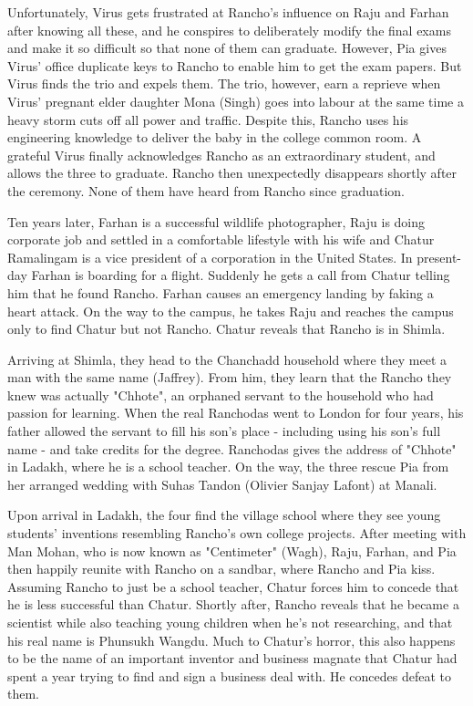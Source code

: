 \documentclass{Article}
\begin{document}
Unfortunately, Virus gets frustrated at Rancho's influence on Raju and Farhan after knowing all these, and he conspires to deliberately modify the final exams and make it so difficult so that none of them can graduate. However, Pia gives Virus' office duplicate keys to Rancho to enable him to get the exam papers. But Virus finds the trio and expels them. The trio, however, earn a reprieve when Virus' pregnant elder daughter Mona (Singh) goes into labour at the same time a heavy storm cuts off all power and traffic. Despite this, Rancho uses his engineering knowledge to deliver the baby in the college common room. A grateful Virus finally acknowledges Rancho as an extraordinary student, and allows the three to graduate. Rancho then unexpectedly disappears shortly after the ceremony. None of them have heard from Rancho since graduation.

Ten years later, Farhan is a successful wildlife photographer, Raju is doing corporate job and settled in a comfortable lifestyle with his wife and Chatur Ramalingam is a vice president of a corporation in the United States. In present-day Farhan is boarding for a flight. Suddenly he gets a call from Chatur telling him that he found Rancho. Farhan causes an emergency landing by faking a heart attack. On the way to the campus, he takes Raju and reaches the campus only to find Chatur but not Rancho. Chatur reveals that Rancho is in Shimla.

Arriving at Shimla, they head to the Chanchadd household where they meet a man with the same name (Jaffrey). From him, they learn that the Rancho they knew was actually "Chhote", an orphaned servant to the household who had passion for learning. When the real Ranchodas went to London for four years, his father allowed the servant to fill his son's place - including using his son's full name - and take credits for the degree. Ranchodas gives the address of "Chhote" in Ladakh, where he is a school teacher. On the way, the three rescue Pia from her arranged wedding with Suhas Tandon (Olivier Sanjay Lafont) at Manali.

Upon arrival in Ladakh, the four find the village school where they see young students' inventions resembling Rancho's own college projects. After meeting with Man Mohan, who is now known as "Centimeter" (Wagh), Raju, Farhan, and Pia then happily reunite with Rancho on a sandbar, where Rancho and Pia kiss. Assuming Rancho to just be a school teacher, Chatur forces him to concede that he is less successful than Chatur. Shortly after, Rancho reveals that he became a scientist while also teaching young children when he's not researching, and that his real name is Phunsukh Wangdu. Much to Chatur's horror, this also happens to be the name of an important inventor and business magnate that Chatur had spent a year trying to find and sign a business deal with. He concedes defeat to them.
\end{document}
